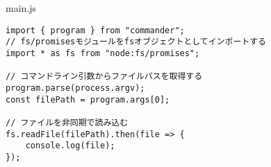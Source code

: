 \begin{listtitle}
main.js
\end{listtitle}
\begin{lstlisting}
import { program } from "commander";
// fs/promisesモジュールをfsオブジェクトとしてインポートする
import * as fs from "node:fs/promises";

// コマンドライン引数からファイルパスを取得する
program.parse(process.argv);
const filePath = program.args[0];

// ファイルを非同期で読み込む
fs.readFile(filePath).then(file => {
    console.log(file);
});
\end{lstlisting}
\listend
